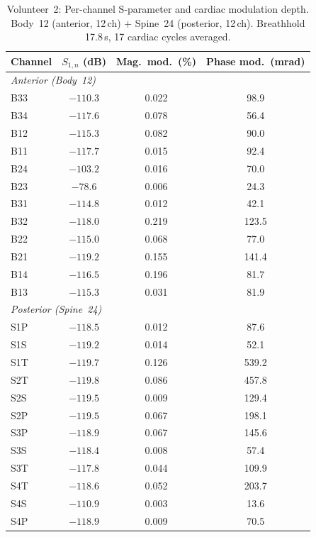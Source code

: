 \begin{table}[htbp]
\centering
\caption{Volunteer~2: Per-channel S-parameter and cardiac modulation depth. Body~12 (anterior, 12\,ch) + Spine~24 (posterior, 12\,ch). Breathhold 17.8\,s, 17 cardiac cycles averaged.}
\label{tab:exp-v2}
\small
\begin{tabular}{lccc}
\hline
Channel & $S_{1,n}$ (dB) & Mag.\ mod.\ (\%) & Phase mod.\ (mrad) \\
\hline
\multicolumn{4}{l}{\textit{Anterior (Body~12)}} \\
\hline
B33 & $-110.3$ & 0.022 & 98.9 \\
B34 & $-117.6$ & 0.078 & 56.4 \\
B12 & $-115.3$ & 0.082 & 90.0 \\
B11 & $-117.7$ & 0.015 & 92.4 \\
B24 & $-103.2$ & 0.016 & 70.0 \\
B23 & $-78.6$ & 0.006 & 24.3 \\
B31 & $-114.8$ & 0.012 & 42.1 \\
B32 & $-118.0$ & 0.219 & 123.5 \\
B22 & $-115.0$ & 0.068 & 77.0 \\
B21 & $-119.2$ & 0.155 & 141.4 \\
B14 & $-116.5$ & 0.196 & 81.7 \\
B13 & $-115.3$ & 0.031 & 81.9 \\
\hline
\multicolumn{4}{l}{\textit{Posterior (Spine~24)}} \\
\hline
S1P & $-118.5$ & 0.012 & 87.6 \\
S1S & $-119.2$ & 0.014 & 52.1 \\
S1T & $-119.7$ & 0.126 & 539.2 \\
S2T & $-119.8$ & 0.086 & 457.8 \\
S2S & $-119.5$ & 0.009 & 129.4 \\
S2P & $-119.5$ & 0.067 & 198.1 \\
S3P & $-118.9$ & 0.067 & 145.6 \\
S3S & $-118.4$ & 0.008 & 57.4 \\
S3T & $-117.8$ & 0.044 & 109.9 \\
S4T & $-118.6$ & 0.052 & 203.7 \\
S4S & $-110.9$ & 0.003 & 13.6 \\
S4P & $-118.9$ & 0.009 & 70.5 \\
\hline
\end{tabular}
\end{table}

